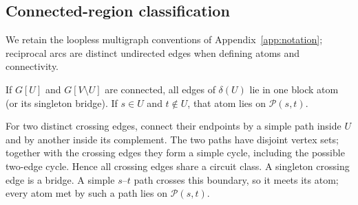 \subsection{Connected-region classification}\label{app:connectedproof}
We retain the loopless multigraph conventions of
Appendix~\ref{app:notation}; reciprocal arcs are distinct undirected
edges when defining atoms and connectivity.

\begin{lemma}\label{lem:bondlocal}
If $G[U]$ and $G[V\setminus U]$ are connected, all edges of
$\delta(U)$ lie in one block atom (or its singleton bridge).
If $s\in U$ and $t\notin U$, that atom lies on $\mathcal P(s,t)$.
\end{lemma}
\begin{pf}
For two distinct crossing edges, connect their endpoints by a simple
path inside $U$ and by another inside its complement. The two paths
have disjoint vertex sets; together with the crossing edges they form
a simple cycle, including the possible two-edge cycle. Hence all
crossing edges share a circuit class. A singleton crossing edge is a
bridge. A simple $s$--$t$ path crosses this boundary, so it meets its
atom; every atom met by such a path lies on $\mathcal P(s,t)$.
\end{pf}

